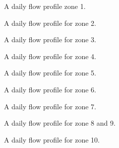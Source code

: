 \begin{figure}[H]
\centering

\caption{A daily flow profile zone 1.}
\label{fig:APP_flow_profile_thulevej}
\end{figure} 

\begin{figure}[H]
\centering

\caption{A daily flow profile for zone 2.}
\label{fig:APP_flow_profile_zone2}
\end{figure} 

\begin{figure}[H]
\centering

\caption{A daily flow profile for zone 3.}
\label{fig:APP_flow_profile_zone3}
\end{figure} 

\begin{figure}[H]
\centering

\caption{A daily flow profile for zone 4.}
\label{fig:APP_flow_profile_zone4}
\end{figure} 

\begin{figure}[H]
\centering

\caption{A daily flow profile for zone 5.}
\label{fig:APP_flow_profile_zone5}
\end{figure} 

\begin{figure}[H]
\centering

\caption{A daily flow profile for zone 6.}
\label{fig:APP_flow_profile_zone6}
\end{figure} 

\begin{figure}[H]
\centering

\caption{A daily flow profile for zone 7.}
\label{fig:APP_flow_profile_zone7}
\end{figure} 

\begin{figure}[H]
\centering

\caption{A daily flow profile for zone 8 and 9.}
\label{fig:APP_flow_profile_zone8_9}
\end{figure} 

\begin{figure}[H]
\centering

\caption{A daily flow profile for zone 10.}
\label{fig:APP_flow_profile_zone10}
\end{figure} 

